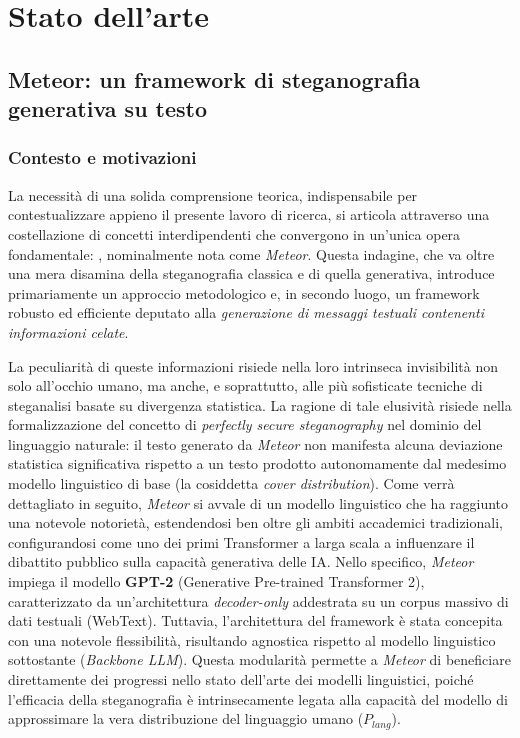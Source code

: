 
\chapter{Stato dell'arte}\label{ch:stato-arte}

\section[Meteor]{Meteor: un framework di steganografia generativa su testo}
\label{sec:meteor}

\subsection{Contesto e motivazioni}
La necessità di una solida comprensione teorica, indispensabile per contestualizzare appieno il presente lavoro di ricerca, si articola attraverso una costellazione di concetti interdipendenti che convergono in un'unica opera fondamentale: \cite{kaptchuk-2021}, nominalmente nota come \emph{Meteor}. Questa indagine, che va oltre una mera disamina della steganografia classica e di quella generativa, introduce primariamente un approccio metodologico e, in secondo luogo, un framework robusto ed efficiente deputato alla \emph{generazione di messaggi testuali contenenti informazioni celate}.

La peculiarità di queste informazioni risiede nella loro intrinseca invisibilità non solo all'occhio umano, ma anche, e soprattutto, alle più sofisticate tecniche di steganalisi basate su divergenza statistica. La ragione di tale elusività risiede nella formalizzazione del concetto di \emph{perfectly secure steganography} nel dominio del linguaggio naturale: il testo generato da \emph{Meteor} non manifesta alcuna deviazione statistica significativa rispetto a un testo prodotto autonomamente dal medesimo modello linguistico di base (la cosiddetta \emph{cover distribution}). Come verrà dettagliato in seguito, \emph{Meteor} si avvale di un modello linguistico che ha raggiunto una notevole notorietà, estendendosi ben oltre gli ambiti accademici tradizionali, configurandosi come uno dei primi Transformer a larga scala a influenzare il dibattito pubblico sulla capacità generativa delle IA. Nello specifico, \emph{Meteor} impiega il modello \textbf{GPT-2} (Generative Pre-trained Transformer 2), caratterizzato da un'architettura \emph{decoder-only} addestrata su un corpus massivo di dati testuali (WebText). Tuttavia, l'architettura del framework è stata concepita con una notevole flessibilità, risultando agnostica rispetto al modello linguistico sottostante (\emph{Backbone LLM}). Questa modularità permette a \emph{Meteor} di beneficiare direttamente dei progressi nello stato dell'arte dei modelli linguistici, poiché l'efficacia della steganografia è intrinsecamente legata alla capacità del modello di approssimare la vera distribuzione del linguaggio umano ($P_{lang}$).

